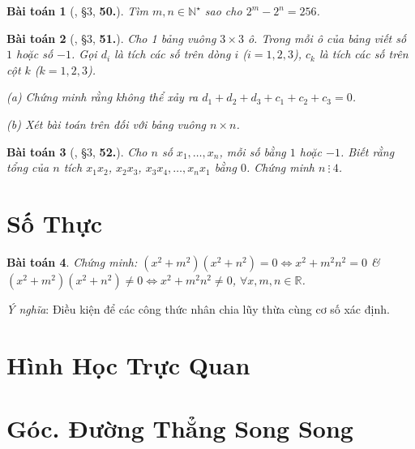 \documentclass{article}
\numberwithin{equation}{section}
\newtheorem{baitoan}{Bài toán}[section]
\begin{document}
\begin{baitoan}[\cite{Binh_Toan_7_tap_1}, \S3, \textbf{50.}]
	Tìm $m,n\in\mathbb{N}^\star$ sao cho $2^m - 2^n = 256$.
\end{baitoan}

\begin{baitoan}[\cite{Binh_Toan_7_tap_1}, \S3, \textbf{51.}]
	Cho 1 bảng vuông $3\times 3$ ô. Trong mỗi ô của bảng viết số $1$ hoặc số $-1$. Gọi $d_i$ là tích các số trên dòng $i$ ($i = 1,2,3$), $c_k$ là tích các số trên cột $k$ ($k = 1,2,3$).
	\begin{enumerate*}
		\item[(a)] Chứng minh rằng không thể xảy ra $d_1 + d_2 + d_3 + c_1 + c_2 + c_3 = 0$.
		\item[(b)] Xét bài toán trên đối với bảng vuông $n\times n$.
	\end{enumerate*}
\end{baitoan}

\begin{baitoan}[\cite{Binh_Toan_7_tap_1}, \S3, \textbf{52.}]
	Cho $n$ số $x_1,\ldots,x_n$, mỗi số bằng $1$ hoặc $-1$. Biết rằng tổng của $n$ tích $x_1x_2$, $x_2x_3$, $x_3x_4,\ldots,x_nx_1$ bằng $0$. Chứng minh $n\ \vdots\ 4$.
\end{baitoan}


\section{Số Thực}

\begin{baitoan}
	Chứng minh: $(x^2 + m^2)(x^2 + n^2) = 0\Leftrightarrow x^2 + m^2n^2 = 0$ \& $(x^2 + m^2)(x^2 + n^2)\ne 0\Leftrightarrow x^2 + m^2n^2\ne 0$, $\forall x,m,n\in\mathbb{R}$.
\end{baitoan}
\textit{Ý nghĩa}: Điều kiện để các công thức nhân chia lũy thừa cùng cơ số xác định.


\newpage
\section{Hình Học Trực Quan}


\section{Góc. Đường Thẳng Song Song}
\end{document}
